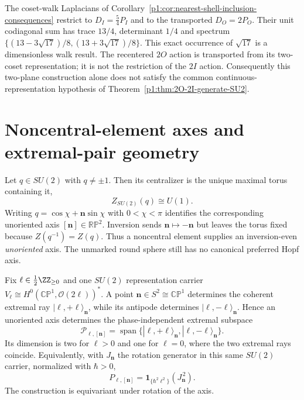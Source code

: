 \documentclass[11pt]{article}
\begin{document}
The coset-walk Laplacians of
Corollary~\ref{p1:cor:nearest-shell-inclusion-consequences} restrict to
\(D_I=\tfrac54P_I\) and to the transported \(D_O=2P_O\).
Their unit codiagonal sum has trace \(13/4\), determinant \(1/4\) and
spectrum \(\{(13-3\sqrt{17})/8,(13+3\sqrt{17})/8\}\).
This exact occurrence of \(\sqrt{17}\) is a dimensionless walk result.
The recentered \(2O\) action is transported from its two-coset
representation; it is not the restriction of the \(2I\) action.
Consequently this two-plane construction alone does not satisfy the
common continuous-representation hypothesis of
Theorem~\ref{p1:thm:2O-2I-generate-SU2}.


\section{Noncentral-element axes and extremal-pair geometry}
\label{p1:app:v191-occurrence-axis-bw}

\begin{proposition}
\label{p1:prop:v191-noncentral-maximal-torus-axis}
Let $q\in SU(2)$ with $q\neq\pm1$.  Then its centralizer is the unique
maximal torus containing it,
\[
 \boxed{Z_{SU(2)}(q)\cong U(1).}
\]
Writing $q=\cos\chi+\mathbf n\sin\chi$ with $0<\chi<\pi$ identifies the
corresponding unoriented axis $[\mathbf n]\in\mathbb{RP}^2$.  Inversion sends
$\mathbf n\mapsto-\mathbf n$ but leaves the torus fixed because
$Z(q^{-1})=Z(q)$.  Thus a noncentral element supplies an
inversion-even \emph{unoriented} axis.  The unmarked round sphere still has no
canonical preferred Hopf axis.
\end{proposition}

\begin{proposition}
\label{p1:prop:v191-bw-extremal-pair}
Fix \(\ell\in\tfrac12\ZZ_{\ge0}\) and one $SU(2)$ representation carrier
$V_\ell\cong H^0(\mathbb{CP}^1,\mathcal O(2\ell))^*$.  A point
$\mathbf n\in S^2\cong\mathbb{CP}^1$ determines the coherent extremal ray
$|\ell,+\ell\rangle_{\mathbf n}$, while its antipode determines
$|\ell,-\ell\rangle_{\mathbf n}$.  Hence an unoriented axis determines the
phase-independent extremal subspace
\[
 \boxed{\mathscr P_{\ell,[\mathbf n]}
 =\operatorname{span}\{|\ell,+\ell\rangle_{\mathbf n},
 |\ell,-\ell\rangle_{\mathbf n}\}.}
\]
Its dimension is two for \(\ell>0\) and one for \(\ell=0\), where the two
extremal rays coincide.  Equivalently, with $J_{\mathbf n}$ the rotation
generator in this same $SU(2)$ carrier, normalized with \(\hbar>0\),
\[
 P_{\ell,[\mathbf n]}
 =\mathbf1_{\{\hbar^2\ell^2\}}(J_{\mathbf n}^{\,2}).
\]
The construction is equivariant under rotation of the axis.
\end{proposition}
\end{document}
